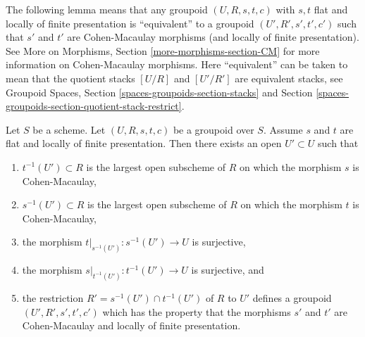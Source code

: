\noindent
The following lemma means that any groupoid $(U, R, s, t, c)$
with $s, t$ flat and locally of finite presentation is ``equivalent'' to
a groupoid $(U', R', s', t', c')$ such that $s'$ and $t'$ are
Cohen-Macaulay morphisms (and locally of finite presentation). See
More on Morphisms, Section \ref{more-morphisms-section-CM}
for more information on Cohen-Macaulay morphisms.
Here ``equivalent'' can be taken to mean that the quotient stacks
$[U/R]$ and $[U'/R']$ are equivalent stacks, see
Groupoid Spaces, Section \ref{spaces-groupoids-section-stacks}
and Section \ref{spaces-groupoids-section-quotient-stack-restrict}.

\begin{lemma}
\label{lemma-make-CM}
Let $S$ be a scheme.
Let $(U, R, s, t, c)$ be a groupoid over $S$.
Assume $s$ and $t$ are flat and locally of finite presentation.
Then there exists an open $U' \subset U$ such that
\begin{enumerate}
\item $t^{-1}(U') \subset R$ is the largest open subscheme of
$R$ on which the morphism $s$ is Cohen-Macaulay,
\item $s^{-1}(U') \subset R$ is the largest open subscheme of
$R$ on which the morphism $t$ is Cohen-Macaulay,
\item the morphism $t|_{s^{-1}(U')} : s^{-1}(U') \to U$ is
surjective,
\item the morphism $s|_{t^{-1}(U')} : t^{-1}(U') \to U$ is
surjective, and
\item the restriction $R' = s^{-1}(U') \cap t^{-1}(U')$
of $R$ to $U'$ defines a groupoid $(U', R', s', t', c')$ which has the property
that the morphisms $s'$ and $t'$ are Cohen-Macaulay and locally of
finite presentation.
\end{enumerate}
\end{lemma}

